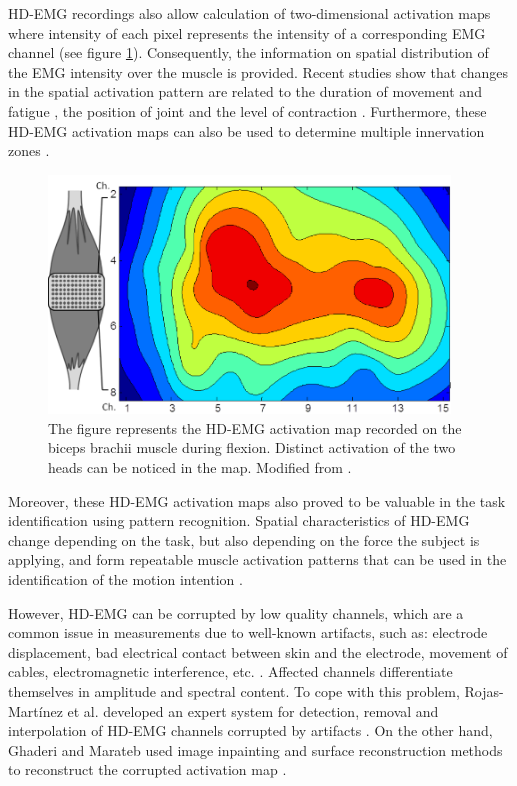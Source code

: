 HD-EMG recordings also allow calculation of two-dimensional activation maps where intensity of each pixel represents the intensity of a corresponding EMG channel (see figure \ref{fig:HD-EMG}). Consequently, the information on spatial distribution of the EMG intensity over the muscle is provided. Recent studies show that changes in the spatial activation pattern are related to the duration of movement and fatigue \citep{Tucker2009, Staudenmann2014}, the position of joint \citep{Vieira2010} and the level of contraction \citep{Holtermann2005}. Furthermore, these HD-EMG activation maps can also be used to determine multiple innervation zones \citep{Marateb2016}.
\begin{figure}[ht]
\centering
\includegraphics[width=0.95\textwidth]{Images/introduction/HD-EMG.png}
\caption{The figure represents the HD-EMG activation map recorded on the biceps brachii muscle during flexion. Distinct activation of the two heads can be noticed in the map. Modified from \citet{Monica-thesis}.}
\label{fig:HD-EMG}
\end{figure}

Moreover, these HD-EMG activation maps also proved to be valuable in the task identification using pattern recognition. Spatial characteristics of HD-EMG change depending on the  task, but also depending on the force the subject is applying, and form repeatable muscle activation patterns that can be used in the identification of the motion intention \citep{Rojas-Martinez2012}.

However, HD-EMG can be corrupted by low quality channels, which are a common issue in measurements due to well-known artifacts, such as: electrode displacement, bad electrical contact between skin and the electrode, movement of cables, electromagnetic interference, etc. \citep{Clancy2002b}. Affected channels differentiate themselves in amplitude and spectral content. To cope with this problem, Rojas-Martínez et al. developed an expert system for detection, removal and interpolation of HD-EMG channels corrupted by artifacts \citep{Rojas-Martinez2012}. On the other hand, Ghaderi and Marateb used image inpainting and surface reconstruction methods to reconstruct the corrupted activation map \citep{Ghaderi2017}.


